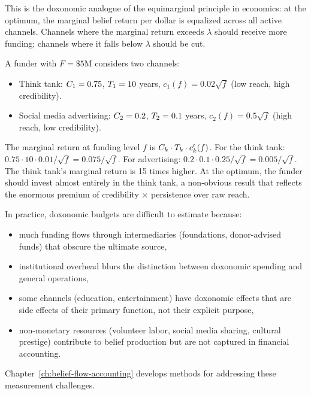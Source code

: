 This is the doxonomic analogue of the equimarginal principle in economics: at the optimum, the marginal belief return per dollar is equalized across all active channels.
Channels where the marginal return exceeds $\lambda$ should receive more funding; channels where it falls below $\lambda$ should be cut.

\begin{example}
\label{ex:allocation}
A funder with $F = \$5\text{M}$ considers two channels:
\begin{itemize}[nosep]
  \item Think tank: $C_{1} = 0.75$, $T_{1} = 10$ years, $c_1(f) = 0.02\sqrt{f}$ (low reach, high credibility).
  \item Social media advertising: $C_{2} = 0.2$, $T_{2} = 0.1$ years, $c_2(f) = 0.5\sqrt{f}$ (high reach, low credibility).
\end{itemize}
The marginal return at funding level $f$ is $C_{k} \cdot T_{k} \cdot c_k'(f)$.
For the think tank: $0.75 \cdot 10 \cdot 0.01 / \sqrt{f} = 0.075/\sqrt{f}$.
For advertising: $0.2 \cdot 0.1 \cdot 0.25/\sqrt{f} = 0.005/\sqrt{f}$.
The think tank's marginal return is 15 times higher.
At the optimum, the funder should invest almost entirely in the think tank, a non-obvious result that reflects the enormous premium of credibility $\times$ persistence over raw reach.
\end{example}

\begin{remark}
\label{rem:budget-opacity}
In practice, doxonomic budgets are difficult to estimate because:
\begin{itemize}[nosep]
  \item much funding flows through intermediaries (foundations, donor-advised funds) that obscure the ultimate source,
  \item institutional overhead blurs the distinction between doxonomic spending and general operations,
  \item some channels (education, entertainment) have doxonomic effects that are side effects of their primary function, not their explicit purpose,
  \item non-monetary resources (volunteer labor, social media sharing, cultural prestige) contribute to belief production but are not captured in financial accounting.
\end{itemize}
Chapter~\ref{ch:belief-flow-accounting} develops methods for addressing these measurement challenges.
\end{remark}


